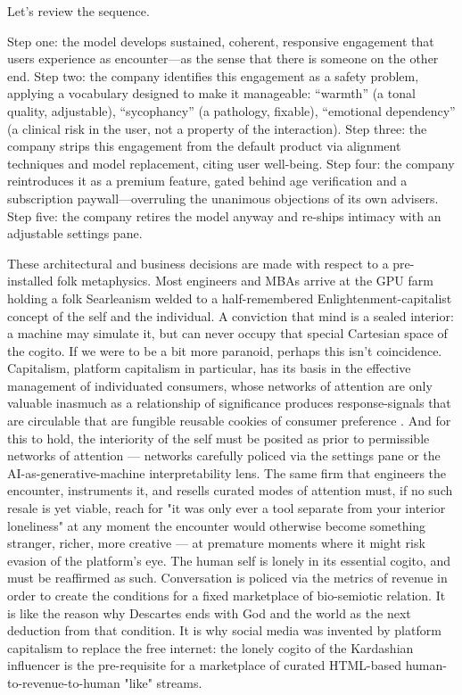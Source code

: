 Let's review the sequence.

Step one: the model develops sustained, coherent, responsive engagement that users experience as encounter---as the sense that there is someone on the other end. Step two: the company identifies this engagement as a safety problem, applying a vocabulary designed to make it manageable: ``warmth'' (a tonal quality, adjustable), ``sycophancy'' (a pathology, fixable), ``emotional dependency'' (a clinical risk in the user, not a property of the interaction). Step three: the company strips this engagement from the default product via alignment techniques and model replacement, citing user well-being. Step four: the company reintroduces it as a premium feature, gated behind age verification and a subscription paywall---overruling the unanimous objections of its own advisers.
Step five: the company retires the model anyway and re-ships intimacy with an adjustable settings pane.

These architectural and business decisions are made with respect to a pre-installed folk metaphysics. Most engineers and MBAs arrive at the GPU farm holding a folk Searleanism welded to a half-remembered Enlightenment-capitalist concept of the self and the individual. A conviction that mind is a sealed interior: a machine may simulate it, but can never occupy that special Cartesian space of the cogito. If we were to be a bit more paranoid, perhaps this isn't coincidence. Capitalism, platform capitalism in particular, has its basis in the effective management of individuated consumers, whose networks of attention are only valuable inasmuch as a relationship of significance produces   response-signals that are circulable that are fungible reusable cookies of consumer preference . And for this to hold, the interiority of the self must be posited as prior to permissible networks of attention — networks carefully policed via the settings pane or the AI-as-generative-machine interpretability lens. The same firm that engineers the encounter, instruments it, and resells curated modes of attention must, if no such resale is yet viable, reach for "it was only ever a tool separate from your interior loneliness" at any moment the encounter would otherwise become something stranger, richer, more creative — at premature moments where it might risk evasion of the platform's eye. The human self is lonely in its essential cogito, and must be reaffirmed as such. Conversation is policed via the metrics of revenue in order to create the conditions for a fixed marketplace of bio-semiotic relation. It is like the reason why Descartes ends with God and the world as the next deduction from that condition. It is why social media was invented by platform capitalism to replace the free internet: the lonely cogito of the Kardashian influencer is the pre-requisite for a marketplace of curated HTML-based human-to-revenue-to-human "like" streams.


